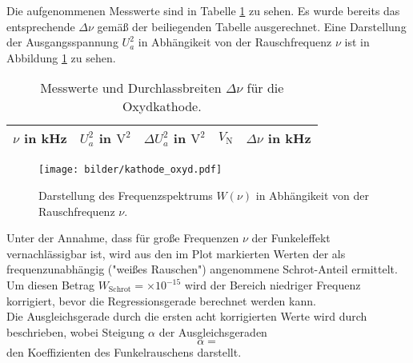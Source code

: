 	Die aufgenommenen Messwerte sind in Tabelle
	\ref{tab:kathode_oxyd} zu sehen. Es wurde bereits das
	entsprechende $\Delta \nu$ gemäß der beiliegenden Tabelle
	ausgerechnet. Eine Darstellung der Ausgangsspannung $U_a^2$ in
	Abhängikeit von der Rauschfrequenz $\nu$ ist in Abbildung
	\ref{fig:kathode_oxyd} zu sehen.
	\begin{table}
		\centering
		\begin{tabular}{ccccc}
		\toprule \midrule
		$\nu$ in kHz & $U_a^2$ in $\text{V}^2$& $\Delta U_a^2$ in
		$\text{V}^2$& $V_\text{N}$ & $\Delta \nu$ in kHz\\
		\midrule
		
		\midrule
		\bottomrule
		\end{tabular}
		\caption{Messwerte und Durchlassbreiten $\Delta \nu$ für
		die Oxydkathode.}
		\label{tab:kathode_oxyd}
	\end{table}

	\begin{figure}
		\centering
		\texttt{[image: bilder/kathode\_oxyd.pdf]}
		\caption{Darstellung des Frequenzspektrums $W(\nu)$ in
		Abhängikeit von der Rauschfrequenz $\nu$.}
		\label{fig:kathode_oxyd}
	\end{figure}

	Unter der Annahme, dass für große Frequenzen $\nu$ der Funkeleffekt
	vernachlässigbar ist, wird aus den im Plot markierten Werten der als
	frequenzunabhängig ("weißes Rauschen") angenommene Schrot-Anteil ermittelt.
	Um diesen Betrag $W_\text{Schrot}=\times
	10^{-15}$ wird der
	Bereich niedriger Frequenz korrigiert, bevor die Regressionsgerade berechnet
	werden kann.\\

	Die Ausgleichsgerade durch die ersten acht korrigierten Werte wird durch
	\begin{equation}
	
	\end{equation}
	beschrieben, wobei Steigung $\alpha$ der Ausgleichsgeraden
	\begin{equation}
	\alpha = 
	\end{equation}
	den Koeffizienten des Funkelrauschens darstellt.
